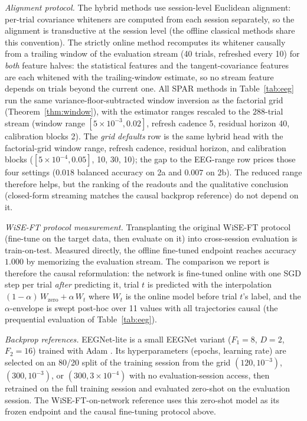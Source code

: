 \documentclass[11pt]{article}
\begin{document}
\emph{Alignment protocol.}
The hybrid methods use session-level Euclidean alignment: per-trial covariance whiteners are computed from each session separately, so the alignment is transductive at the session level (the offline classical methods share this convention).
The strictly online method recomputes its whitener causally from a trailing window of the evaluation stream (40 trials, refreshed every 10) for \emph{both} feature halves: the statistical features and the tangent-covariance features are each whitened with the trailing-window estimate, so no stream feature depends on trials beyond the current one.
All SPAR methods in Table~\ref{tab:eeg} run the same variance-floor-subtracted window inversion as the factorial grid (Theorem~\ref{thm:window}), with the estimator ranges rescaled to the $288$-trial stream (window range $[5\times10^{-3},0.02]$, refresh cadence 5, residual horizon 40, calibration blocks 2).
The \emph{grid defaults} row is the same hybrid head with the factorial-grid window range, refresh cadence, residual horizon, and calibration blocks ($[5\times10^{-4},0.05]$, 10, 30, 10); the gap to the EEG-range row prices those four settings ($0.018$ balanced accuracy on 2a and $0.007$ on 2b).
The reduced range therefore helps, but the ranking of the readouts and the qualitative conclusion (closed-form streaming matches the causal backprop reference) do not depend on it.

\emph{WiSE-FT protocol measurement.}
Transplanting the original WiSE-FT protocol \citep{wortsman2022wiseft} (fine-tune on the target data, then evaluate on it) into cross-session evaluation is train-on-test.
Measured directly, the offline fine-tuned endpoint reaches accuracy $1.000$ by memorizing the evaluation stream.
The comparison we report is therefore the causal reformulation: the network is fine-tuned online with one SGD step per trial \emph{after} predicting it, trial $t$ is predicted with the interpolation $(1 - \alpha)\,W_{\mathrm{zero}} + \alpha\,W_t$ where $W_t$ is the online model before trial $t$'s label, and the $\alpha$-envelope is swept post-hoc over 11 values with all trajectories causal (the prequential evaluation of Table~\ref{tab:eeg}).

\emph{Backprop references.}
EEGNet-lite is a small EEGNet variant \citep{lawhern2018eegnet} ($F_1 = 8$, $D = 2$, $F_2 = 16$) trained with Adam \citep{kingma2015adam}.
Its hyperparameters (epochs, learning rate) are selected on an 80/20 split of the training session from the grid $(120, 10^{-3})$, $(300, 10^{-3})$, or $(300, 3 \times 10^{-4})$ with no evaluation-session access, then retrained on the full training session and evaluated zero-shot on the evaluation session.
The WiSE-FT-on-network reference uses this zero-shot model as its frozen endpoint and the causal fine-tuning protocol above.
\end{document}
